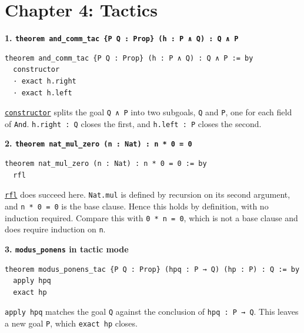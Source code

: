 \section{Chapter 4: Tactics}\label{sec:14-appendix-solutions:03-chapter-4:1}

\textbf{1. \texttt{theorem and\_\allowbreak{}comm\_\allowbreak{}tac \{P Q : Prop\} (h : P ∧ Q) : Q ∧ P}}

\begin{lstlisting}
theorem and_comm_tac {P Q : Prop} (h : P ∧ Q) : Q ∧ P := by
  constructor
  · exact h.right
  · exact h.left
\end{lstlisting}

\href{https://lean-lang.org/doc/reference/latest/Tactic-Proofs/Tactic-Reference/}{\texttt{constructor}} splits the goal \texttt{Q ∧ P} into two subgoals, \texttt{Q} and \texttt{P}, one for each field of \texttt{And}. \texttt{h.right : Q} closes the first, and \texttt{h.left : P} closes the second.

\textbf{2. \texttt{theorem nat\_\allowbreak{}mul\_\allowbreak{}zero (n : Nat) : n * 0 = 0}}

\begin{lstlisting}
theorem nat_mul_zero (n : Nat) : n * 0 = 0 := by
  rfl
\end{lstlisting}

\href{https://lean-lang.org/doc/reference/latest/Tactic-Proofs/Tactic-Reference/}{\texttt{rfl}} does succeed here. \texttt{Nat.mul} is defined by recursion on its second argument, and \texttt{n * 0 = 0} is the base clause. Hence this holds by definition, with no induction required. Compare this with \texttt{0 * n = 0}, which is not a base clause and does require induction on \texttt{n}.

\textbf{3. \texttt{modus\_\allowbreak{}ponens} in tactic mode}

\begin{lstlisting}
theorem modus_ponens_tac {P Q : Prop} (hpq : P → Q) (hp : P) : Q := by
  apply hpq
  exact hp
\end{lstlisting}

\texttt{apply hpq} matches the goal \texttt{Q} against the conclusion of \texttt{hpq : P → Q}. This leaves a new goal \texttt{P}, which \texttt{exact hp} closes.
